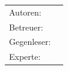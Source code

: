 \begin{titlepage}
\begin{center}
	\vspace{1ex}
	\LARGE 
	\place
	
	\vspace{5ex}
	\begin{framed}
		\timeperiod
	\end{framed}
\end{center}

\vspace{11ex}
\begin{tabular}{ll} %
	Autoren:        & \authors    \\
	Betreuer:        & \advisor    \\
	Gegenleser:        & \revisor     \\
	Experte:			& \expert \\
\end{tabular}

\end{titlepage}

\restoregeometry %

